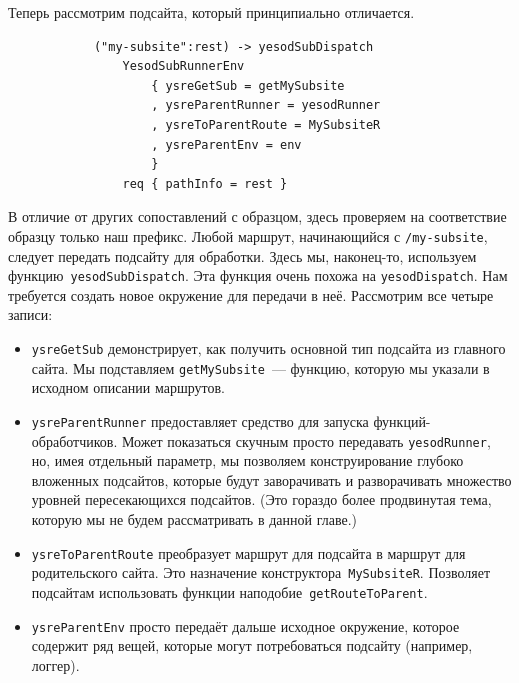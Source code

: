 Теперь рассмотрим подсайта, который принципиально отличается.

\begin{lstlisting}
            ("my-subsite":rest) -> yesodSubDispatch
                YesodSubRunnerEnv
                    { ysreGetSub = getMySubsite
                    , ysreParentRunner = yesodRunner
                    , ysreToParentRoute = MySubsiteR
                    , ysreParentEnv = env
                    }
                req { pathInfo = rest }
\end{lstlisting}

В отличие от других сопоставлений с образцом, здесь проверяем на соответствие
образцу только наш префикс. Любой маршрут, начинающийся с \texttt{/my-subsite},
следует передать подсайту для обработки. Здесь мы, наконец-то, используем
функцию~\lstinline'yesodSubDispatch'. Эта функция очень похожа на
\lstinline'yesodDispatch'. Нам требуется создать новое окружение для передачи в
неё. Рассмотрим все четыре записи:
\begin{itemize}
    \item \lstinline'ysreGetSub' демонстрирует, как получить основной тип
        подсайта из главного сайта. Мы подставляем \lstinline'getMySubsite'~---
        функцию, которую мы указали в исходном описании маршрутов.

    \item \lstinline'ysreParentRunner' предоставляет средство для запуска
        функций-обработчиков. Может показаться скучным просто передавать
        \lstinline'yesodRunner', но, имея отдельный параметр, мы позволяем
        конструирование глубоко вложенных подсайтов, которые будут заворачивать
        и разворачивать множество уровней пересекающихся подсайтов. (Это
        гораздо более продвинутая тема, которую мы не будем рассматривать в
        данной главе.)

    \item \lstinline'ysreToParentRoute' преобразует маршрут для подсайта в
        маршрут для родительского сайта. Это назначение
        конструктора~\lstinline'MySubsiteR'. Позволяет подсайтам использовать
        функции наподобие~\lstinline'getRouteToParent'.

    \item \lstinline'ysreParentEnv' просто передаёт дальше исходное окружение,
        которое содержит ряд вещей, которые могут потребоваться подсайту
        (например, логгер).
\end{itemize}

